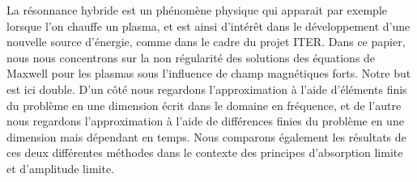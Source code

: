 La r\'esonnance hybride est un ph\'enom\`ene physique qui apparait par exemple lorsque l'on chauffe un plasma, et est ainsi d'int\'er\^et dans le d\'eveloppement d'une nouvelle source d'\'energie, comme dans le cadre du projet ITER. Dans ce papier, nous nous concentrons sur la non r\'egularit\'e des solutions des \'equations de Maxwell pour les plasmas sous l'influence de champ magn\'etiques forts. Notre but est ici double. D'un c\^ot\'e nous regardons l'approximation \`a l'aide d'\'el\'ements finis du probl\`eme en une dimension \'ecrit dans le domaine en fr\'equence, et de l'autre nous regardons l'approximation \`a l'aide de diff\'erences finies du probl\`eme en une dimension mais d\'ependant en temps. Nous comparons \'egalement les r\'esultats de ces deux diff\'erentes m\'ethodes dans le contexte des principes d'absorption limite et d'amplitude limite.